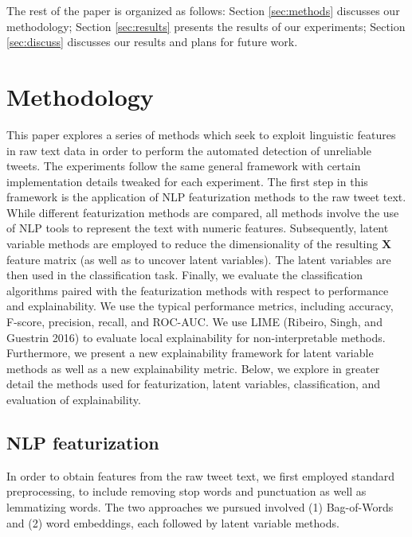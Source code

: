 \documentclass{article}
\begin{document}
The rest of the paper is organized as follows: Section \ref{sec:methods}
discusses our methodology; Section \ref{sec:results} presents the
results of our experiments; Section \ref{sec:discuss} discusses our
results and plans for future work.

\hypertarget{methodology}{%
\section{Methodology}\label{methodology}}

\label{sec:methods} This paper explores a series of methods which seek
to exploit linguistic features in raw text data in order to perform the
automated detection of unreliable tweets. The experiments follow the
same general framework with certain implementation details tweaked for
each experiment. The first step in this framework is the application of
NLP featurization methods to the raw tweet text. While different
featurization methods are compared, all methods involve the use of NLP
tools to represent the text with numeric features. Subsequently, latent
variable methods are employed to reduce the dimensionality of the
resulting \(\mathbf{X}\) feature matrix (as well as to uncover latent
variables). The latent variables are then used in the classification
task. Finally, we evaluate the classification algorithms paired with the
featurization methods with respect to performance and explainability. We
use the typical performance metrics, including accuracy, F-score,
precision, recall, and ROC-AUC. We use LIME (Ribeiro, Singh, and
Guestrin 2016) to evaluate local explainability for non-interpretable
methods. Furthermore, we present a new explainability framework for
latent variable methods as well as a new explainability metric. Below,
we explore in greater detail the methods used for featurization, latent
variables, classification, and evaluation of explainability.

\hypertarget{nlp-featurization}{%
\subsection{NLP featurization}\label{nlp-featurization}}

In order to obtain features from the raw tweet text, we first employed
standard preprocessing, to include removing stop words and punctuation
as well as lemmatizing words. The two approaches we pursued involved (1)
Bag-of-Words and (2) word embeddings, each followed by latent variable
methods.
\end{document}
